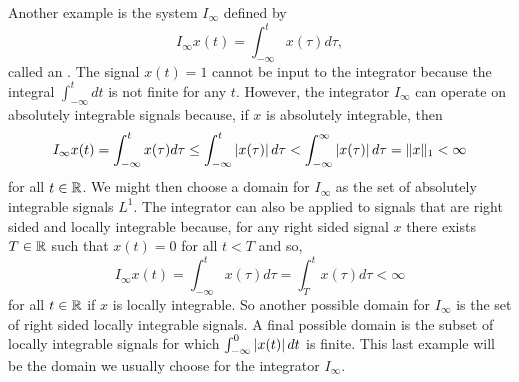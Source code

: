 Another example is the system $I_\infty$ defined by
\begin{equation}\label{eq:deifferentiator}
I_{\infty}x(t) = \int_{-\infty}^{t} x(\tau) d\tau ,
\end{equation}
called an .  %
The signal $x(t) = 1$ cannot be input to the integrator because the integral $\int_{-\infty}^{t} dt$ is not finite for any $t$.  However, the integrator $I_\infty$ can operate on absolutely integrable signals because, if $x$ is absolutely integrable, then 
\[
I_\infty x(t) = \int_{-\infty}^{t} x(\tau) d\tau \leq \int_{-\infty}^{t} \left\vert x(\tau) \right\vert d\tau <  \int_{-\infty}^{\infty} \left\vert x(\tau) \right\vert d\tau = \|x\|_1 < \infty
\] 
for all $t \in {\mathbb R}$.  We might then choose a domain for $I_\infty$ as the set of absolutely integrable signals $L^1$.  The integrator can also be applied to signals that are right sided and locally integrable because, for any right sided signal $x$ there exists $T \in {\mathbb R}$ such that $x(t) = 0$ for all $t < T$ and so,
\[
I_\infty x(t) = \int_{-\infty}^{t} x(\tau) d\tau = \int_{T}^{t} x(\tau) d\tau < \infty
\]
for all $t \in {\mathbb R}$ if $x$ is locally integrable.  So another possible domain for $I_\infty$ is the set of right sided locally integrable signals.  A final possible domain is the subset of locally integrable signals for which $\int_{-\infty}^0 \left\vert x(t) \right\vert dt$ is finite.  This last example will be the domain we usually choose for the integrator $I_\infty$.


